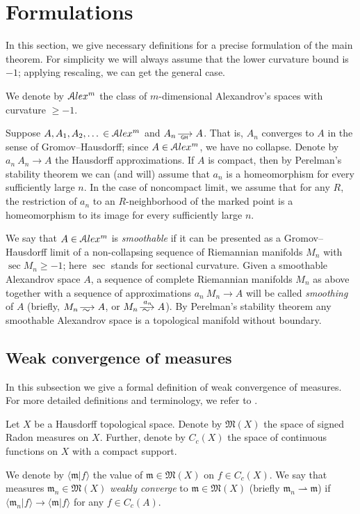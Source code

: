 \section{Formulations}

In this section, we give necessary definitions for a precise formulation of the main theorem.
For simplicity  we will always assume that the lower
curvature bound is  $-1$;
applying rescaling, we can get the general case.

We denote by
$\mathcal{A}lex^m$ the class of $m$-dimensional Alexandrov's spaces
with curvature $\ge -1$.

Suppose $A,A_1,A_2,\dots{} \in \mathcal{A}lex^m$ and $A_n\GHto A$.
That is, $A_n$ converges to 
$A$ in the sense of Gromov--Hausdorff;
since $A\in \mathcal{A}lex^m$, we have no collapse.
Denote by $a_n\:A_n\to A$ the Hausdorff approximations.
If $A$ is compact, then
by Perelman's stability theorem \cite{PerStab,KapStab} we can (and will) assume that $a_n$ is a homeomorphism for every sufficiently large $n$.
In the case of noncompact limit, we assume that for any $R$, the restriction of $a_n$ to an $R$-neighborhood of the marked point is a homeomorphism to its image for every sufficiently large $n$.

We say that $A\in \mathcal{A}lex^m$ is \emph{smoothable}
if it can be presented as a Gromov--Hausdorff limit of a non-collapsing sequence of Riemannian manifolds $M_n$ with $\sec M_n\ge-1$; here $\sec$ stands for sectional curvature.
Given a smoothable Alexandrov space $A$,
a sequence of complete Riemannian manifolds $M_n$ as above
together with a sequence of approximations $a_n\:M_n\to A$
will be called \emph{smoothing} of $A$
(briefly, $M_n\smooths{} A$, or $M_n\smooths{a_n} A$).
By Perelman's stability theorem any smoothable Alexandrov space is a topological manifold without boundary.

\subsection{Weak convergence of measures}

In this subsection we give a formal definition of weak convergence of measures.
For more detailed definitions and terminology, we refer to
\cite{GMS}.

Let $X$ be a Hausdorff topological space.
Denote by $\mathfrak M(X)$ the space of signed Radon measures on $X$.
Further, denote by $C_c(X)$  the space of continuous functions on $X$
with a compact support. 

We  denote by $\langle \mathfrak m|f\rangle $ the value of $\mathfrak m\in\mathfrak M(X)$ on $f\in C_c(X)$.
We say that measures $\mathfrak m_n\in \mathfrak M(X)$ \emph{weakly converge} to $\mathfrak m\in \mathfrak M(X)$ (briefly
$\mathfrak m_n\rightharpoonup \mathfrak m$) if $\langle \mathfrak m_n|f\rangle \to \langle \mathfrak m|f\rangle $ for any $f\in C_c(A)$.

